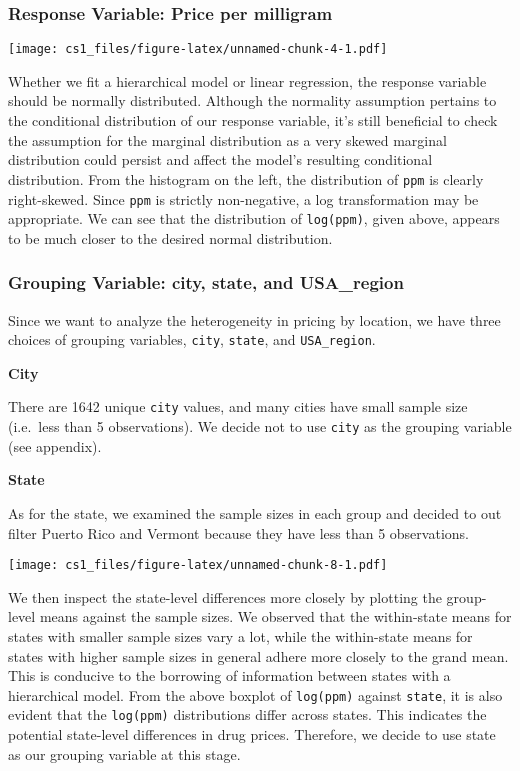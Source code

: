 \documentclass[
  11pt,
]{article}
\begin{document}
\hypertarget{response-variable-price-per-milligram}{%
\subsubsection{Response Variable: Price per
milligram}\label{response-variable-price-per-milligram}}

\texttt{[image: cs1\_files/figure-latex/unnamed-chunk-4-1.pdf]}

Whether we fit a hierarchical model or linear regression, the response
variable should be normally distributed. Although the normality
assumption pertains to the conditional distribution of our response
variable, it's still beneficial to check the assumption for the marginal
distribution as a very skewed marginal distribution could persist and
affect the model's resulting conditional distribution. From the
histogram on the left, the distribution of \texttt{ppm} is clearly
right-skewed. Since \texttt{ppm} is strictly non-negative, a log
transformation may be appropriate. We can see that the distribution of
\texttt{log(ppm)}, given above, appears to be much closer to the desired
normal distribution.

\hypertarget{grouping-variable-city-state-and-usa_region}{%
\subsubsection{Grouping Variable: city, state, and
USA\_region}\label{grouping-variable-city-state-and-usa_region}}

Since we want to analyze the heterogeneity in pricing by location, we
have three choices of grouping variables, \texttt{city}, \texttt{state},
and \texttt{USA\_region}.

\textbf{City}

There are 1642 unique \texttt{city} values, and many cities have small
sample size (i.e.~less than 5 observations). We decide not to use
\texttt{city} as the grouping variable (see appendix).

\textbf{State}

As for the state, we examined the sample sizes in each group and decided
to out filter Puerto Rico and Vermont because they have less than 5
observations.

\texttt{[image: cs1\_files/figure-latex/unnamed-chunk-8-1.pdf]}

We then inspect the state-level differences more closely by plotting the
group-level means against the sample sizes. We observed that the
within-state means for states with smaller sample sizes vary a lot,
while the within-state means for states with higher sample sizes in
general adhere more closely to the grand mean. This is conducive to the
borrowing of information between states with a hierarchical model. From
the above boxplot of \texttt{log(ppm)} against \texttt{state}, it is
also evident that the \texttt{log(ppm)} distributions differ across
states. This indicates the potential state-level differences in drug
prices. Therefore, we decide to use state as our grouping variable at
this stage.
\end{document}
